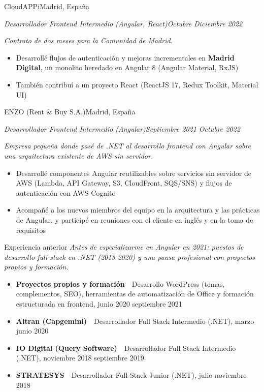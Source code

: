 \documentclass[10pt,a4paper]{article}
\newcommand{\job}[4]{%
  \vspace{5pt}%
  {\latosemibold\color{dark}#1\hfill{\latolight\small\color{light}#2}}\par
  {\itshape\small\color{mid}#3\hfill{\latolight\small\color{light}#4}}\par\vspace{2pt}%
}
\newcommand{\context}[1]{%
  {\latolight\itshape\small\color{mid}\hspace{0.8em}#1}\vspace{2pt}%
}
\newenvironment{items}{%
  \begin{itemize}[leftmargin=1.2em, itemsep=0pt, topsep=2pt, parsep=0pt, label={\color{light}\textbullet}]
    \normalsize\color{dark}
}{%
  \end{itemize}%
}
\begin{document}
\job{CloudAPPi}{Madrid, España}{Desarrollador Frontend Intermedio (Angular, React)}{Octubre \textendash{} Diciembre 2022}
\context{Contrato de dos meses para la Comunidad de Madrid.}
\begin{items}
  \item Desarrollé flujos de autenticación y mejoras incrementales en \textbf{Madrid Digital}, un monolito heredado en Angular 8 (Angular Material, RxJS)
  \item También contribuí a un proyecto React (ReactJS 17, Redux Toolkit, Material UI)
\end{items}

\job{ENZO (Rent \& Buy S.A.)}{Madrid, España}{Desarrollador Frontend Intermedio (Angular)}{Septiembre 2021 \textendash{} Octubre 2022}
\context{Empresa pequeña donde pasé de .NET al desarrollo frontend con Angular sobre una arquitectura existente de AWS sin servidor.}
\begin{items}
  \item Desarrollé componentes Angular reutilizables sobre servicios sin servidor de AWS (Lambda, API Gateway, S3, CloudFront, SQS/SNS) y flujos de autenticación con AWS Cognito
  \item Acompañé a los nuevos miembros del equipo en la arquitectura y las prácticas de Angular, y participé en reuniones con el cliente en inglés y en la toma de requisitos
\end{items}

\vspace{4pt}
{\latosemibold\small\color{dark} Experiencia anterior}\vspace{1pt}
\context{Antes de especializarme en Angular en 2021: puestos de desarrollo full stack en .NET (2018 \textendash{} 2020) y una pausa profesional con proyectos propios y formación.}
\begin{items}
  \item \textbf{Proyectos propios y formación} \,\textperiodcentered\, Desarrollo WordPress (temas, complementos, SEO), herramientas de automatización de Office y formación estructurada en frontend, junio 2020 \textendash{} septiembre 2021
  \item \textbf{Altran (Capgemini)} \,\textperiodcentered\, Desarrollador Full Stack Intermedio (.NET), marzo \textendash{} junio 2020
  \item \textbf{IO Digital (Query Software)} \,\textperiodcentered\, Desarrollador Full Stack Intermedio (.NET), noviembre 2018 \textendash{} septiembre 2019
  \item \textbf{STRATESYS} \,\textperiodcentered\, Desarrollador Full Stack Junior (.NET), julio \textendash{} noviembre 2018
\end{items}
\end{document}
